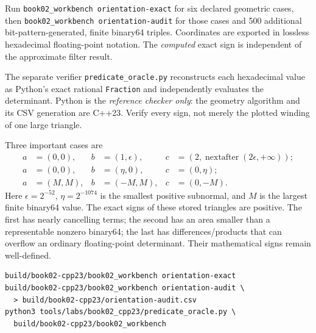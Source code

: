 \begin{booktwolab}
Run \texttt{book02\_workbench orientation-exact} for
six declared geometric cases, then
\texttt{book02\_workbench orientation-audit} for
those cases and 500 additional bit-pattern-generated,
finite binary64 triples. Coordinates are exported in
lossless hexadecimal floating-point notation. The
\emph{computed} exact sign is independent of the
approximate filter result.

The separate verifier \texttt{predicate\_oracle.py}
reconstructs each hexadecimal value as Python's exact
rational \texttt{Fraction} and independently evaluates
the determinant. Python is the \emph{reference checker
only}: the geometry algorithm and its CSV generation
are C++23. Verify every sign, not merely the plotted
winding of one large triangle.

Three important cases are
\[
\begin{aligned}
a&=(0,0),&b&=(1,\epsilon),&
c&=(2,\operatorname{nextafter}(2\epsilon,+\infty));\\
a&=(0,0),&b&=(\eta,0),&
c&=(0,\eta);\\
a&=(M,M),&b&=(-M,M),&
c&=(0,-M).
\end{aligned}
\]
Here \(\epsilon=2^{-52}\), \(\eta=2^{-1074}\)
is the smallest positive subnormal, and
\(M\) is the largest finite binary64 value.
The exact signs of these stored triangles are positive.
The first has nearly cancelling terms; the second has
an area smaller than a representable nonzero binary64;
the last has differences/products that can overflow
an ordinary floating-point determinant.
Their mathematical signs remain well-defined.
\end{booktwolab}

\begin{Shaded}
\begin{verbatim}
build/book02-cpp23/book02_workbench orientation-exact
build/book02-cpp23/book02_workbench orientation-audit \
  > build/book02-cpp23/orientation-audit.csv
python3 tools/labs/book02_cpp23/predicate_oracle.py \
  build/book02-cpp23/book02_workbench
\end{verbatim}
\end{Shaded}

